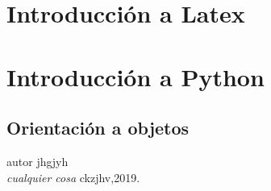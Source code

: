 \documentclass{book}
\begin{document}
\chapter{Introducción a Latex}
\chapter{Introducción a Python}
\section*{Orientación a objetos}

\begin{thebibliography}{9}
	autor jhgjyh\\
	\textit{cualquier cosa}
	ckzjhv,2019.
\end{thebibliography}
\end{document}
